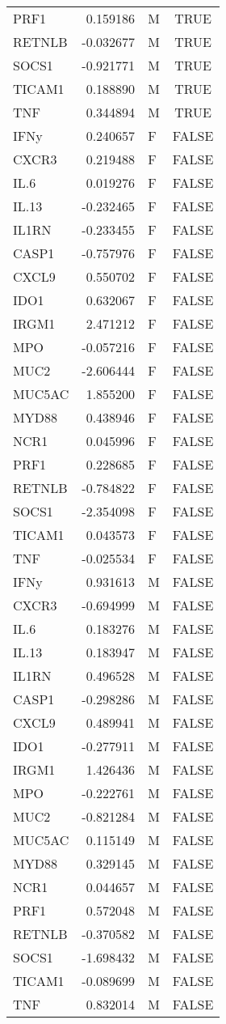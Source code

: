 \begin{longtable}{lrlc}
PRF1 & 0.159186 & M & TRUE \\ 
RETNLB & -0.032677 & M & TRUE \\ 
SOCS1 & -0.921771 & M & TRUE \\ 
TICAM1 & 0.188890 & M & TRUE \\ 
TNF & 0.344894 & M & TRUE \\ 
IFNy & 0.240657 & F & FALSE \\ 
CXCR3 & 0.219488 & F & FALSE \\ 
IL.6 & 0.019276 & F & FALSE \\ 
IL.13 & -0.232465 & F & FALSE \\ 
IL1RN & -0.233455 & F & FALSE \\ 
CASP1 & -0.757976 & F & FALSE \\ 
CXCL9 & 0.550702 & F & FALSE \\ 
IDO1 & 0.632067 & F & FALSE \\ 
IRGM1 & 2.471212 & F & FALSE \\ 
MPO & -0.057216 & F & FALSE \\ 
MUC2 & -2.606444 & F & FALSE \\ 
MUC5AC & 1.855200 & F & FALSE \\ 
MYD88 & 0.438946 & F & FALSE \\ 
NCR1 & 0.045996 & F & FALSE \\ 
PRF1 & 0.228685 & F & FALSE \\ 
RETNLB & -0.784822 & F & FALSE \\ 
SOCS1 & -2.354098 & F & FALSE \\ 
TICAM1 & 0.043573 & F & FALSE \\ 
TNF & -0.025534 & F & FALSE \\ 
IFNy & 0.931613 & M & FALSE \\ 
CXCR3 & -0.694999 & M & FALSE \\ 
IL.6 & 0.183276 & M & FALSE \\ 
IL.13 & 0.183947 & M & FALSE \\ 
IL1RN & 0.496528 & M & FALSE \\ 
CASP1 & -0.298286 & M & FALSE \\ 
CXCL9 & 0.489941 & M & FALSE \\ 
IDO1 & -0.277911 & M & FALSE \\ 
IRGM1 & 1.426436 & M & FALSE \\ 
MPO & -0.222761 & M & FALSE \\ 
MUC2 & -0.821284 & M & FALSE \\ 
MUC5AC & 0.115149 & M & FALSE \\ 
MYD88 & 0.329145 & M & FALSE \\ 
NCR1 & 0.044657 & M & FALSE \\ 
PRF1 & 0.572048 & M & FALSE \\ 
RETNLB & -0.370582 & M & FALSE \\ 
SOCS1 & -1.698432 & M & FALSE \\ 
TICAM1 & -0.089699 & M & FALSE \\ 
TNF & 0.832014 & M & FALSE \\ 
\bottomrule
\end{longtable}

